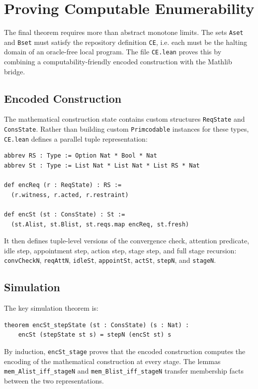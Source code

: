 \section{Proving Computable Enumerability}

The final theorem requires more than abstract monotone limits.  The sets
\texttt{Aset} and \texttt{Bset} must satisfy the repository definition
\texttt{CE}, i.e. each must be the halting domain of an oracle-free local
program.  The file \texttt{CE.lean} proves this by combining a
computability-friendly encoded construction with the Mathlib bridge.

\subsection{Encoded Construction}

The mathematical construction state contains custom structures
\texttt{ReqState} and \texttt{ConsState}.  Rather than building custom
\texttt{Primcodable} instances for these types, \texttt{CE.lean} defines a
parallel tuple representation:

\begin{lstlisting}
abbrev RS : Type := Option Nat * Bool * Nat
abbrev St : Type := List Nat * List Nat * List RS * Nat

def encReq (r : ReqState) : RS :=
  (r.witness, r.acted, r.restraint)

def encSt (st : ConsState) : St :=
  (st.Alist, st.Blist, st.reqs.map encReq, st.fresh)
\end{lstlisting}

It then defines tuple-level versions of the convergence check, attention
predicate, idle step, appointment step, action step, stage step, and full
stage recursion: \texttt{convCheckN}, \texttt{reqAttN}, \texttt{idleSt},
\texttt{appointSt}, \texttt{actSt}, \texttt{stepN}, and \texttt{stageN}.

\subsection{Simulation}

The key simulation theorem is:

\begin{lstlisting}
theorem encSt_stepState (st : ConsState) (s : Nat) :
    encSt (stepState st s) = stepN (encSt st) s
\end{lstlisting}

By induction, \texttt{encSt_stage} proves that the encoded construction
computes the encoding of the mathematical construction at every stage.
The lemmas \texttt{mem_Alist_iff_stageN} and
\texttt{mem_Blist_iff_stageN} transfer membership facts between the two
representations.

